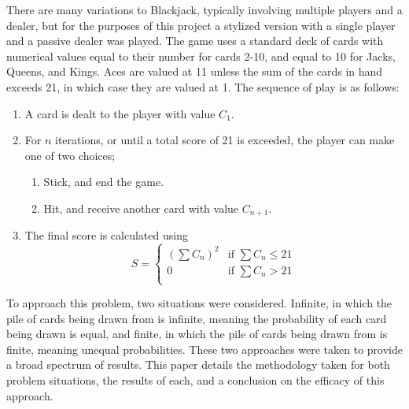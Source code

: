 
\smallskip
There are many variations to Blackjack, typically involving multiple players and a dealer, but for the purposes of this project a stylized version with a single player and a passive dealer was played. The game uses a standard deck of cards with numerical values equal to their number for cards 2-10, and equal to 10 for Jacks, Queens, and Kings. Aces are valued at 11 unless the sum of the cards in hand exceeds 21, in which case they are valued at 1. The sequence of play is as follows:
\begin{enumerate}
    \item A card is dealt to the player with value \(C_1\).
    \item For \(n\) iterations, or until a total score of 21 is exceeded, the player can make one of two choices;
    \begin{enumerate} 
        \item Stick, and end the game.
        \item Hit, and receive another card with value \(C_{n+1}\).
    \end{enumerate}
    \item The final score is calculated using
        \begin{equation} \label{eq: Score}
            S= 
            \begin{cases}
                (\sum C_n)^2 & \text{if } \sum C_n \le 21\\
                0            & \text{if } \sum C_n >   21\\
            \end{cases}
        \end{equation}
\end{enumerate}
\smallskip
To approach this problem, two situations were considered. Infinite, in which the pile of cards being drawn from is infinite, meaning the probability of each card being drawn is equal, and finite, in which the pile of cards being drawn from is finite, meaning unequal probabilities. These two approaches were taken to provide a broad spectrum of results. This paper details the methodology taken for both problem situations, the results of each, and a conclusion on the efficacy of this approach.